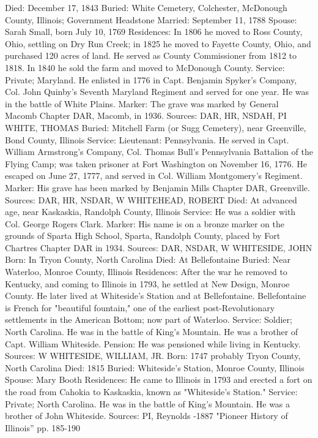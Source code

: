 Died:  December 17, 1843 
Buried: White Cemetery, Colchester, McDonough County, Illinois; Government 
Headstone Married: September 11, 1788 
Spouse: Sarah Small, born July 10, 1769 
Residences: In 1806 he moved to Ross County, Ohio, settling on Dry Run Creek; in 1825 he moved to Fayette County, Ohio, and purchased 120 acres of land. He served as County Commissioner from 1812 to 1818. In 1840 he sold the farm and moved to McDonough County. 
Service: Private; Maryland. He enlisted in 1776 in Capt. Benjamin Spyker's Company, Col. John Quinby's Seventh Maryland Regiment and served for one year. He was in the battle of White Plains. 
Marker: The grave was marked by General Macomb Chapter DAR, Macomb, in 1936. 
Sources: DAR, HR, NSDAH, PI 
WHITE, THOMAS 
Buried: Mitchell Farm (or Sugg Cemetery), near Greenville, Bond County, Illinois
Service: Lieutenant: Pennsylvania. He served in Capt. William Armstrong's Com­pany, Col. Thomas Bull's Pennsylvania Battalion of the Flying Camp; was taken prisoner at Fort Washington on November 16, 1776. He escaped on June 27, 1777, and served in Col. William Montgomery's Regiment. 
Marker: His grave has been marked by Benjamin Mills Chapter DAR, Greenville. 
Sources: DAR, HR, NSDAR, W 
WHITEHEAD, ROBERT
Died: At advanced age, near Kaskaskia, Randolph County, Illinois
Service: He was a soldier with Col. George Rogers Clark.
Marker: His name is on a bronze marker on the grounds of Sparta High School, Sparta, Randolph County, placed by Fort Chartres Chapter DAR in 1934. 
Sources: DAR, NSDAR, W 
WHITESIDE, JOHN 
Born: In Tryon County, North Carolina 
Died: At Bellefontaine 
Buried: Near Waterloo, Monroe County, Illinois 
Residences: After the war he removed to Kentucky, and coming to Illinois in 1793, he settled at New Design, Monroe County. He later lived at White­side's Station and at Bellefontaine. Bellefontaine is French for "beautiful fountain," one of the earliest post-Revolutionary settlements in the American Bottom; now part of Waterloo. 
Service: Soldier; North Carolina. He was in the battle of King's Mountain. He was a brother of Capt. William Whiteside. 
Pension: He was pensioned while living in Kentucky. 
Sources: W 
WHITESIDE, WILLIAM, JR. 
Born: 1747 probably Tryon County, North Carolina
Died: 1815 
Buried: Whiteside's Station, Monroe County, Illinois Spouse: Mary Booth Residences: He came to Illinois in 1793 and erected a fort on the road from Cahokia to Kaskaskia, known as "Whiteside's Station."
Service: Private; North Carolina. He was in the battle of King's Mountain. He was a brother of John Whiteside. 
Sources: PI, Reynolds -1887 "Pioneer History of Illinois” pp. 185-190 
